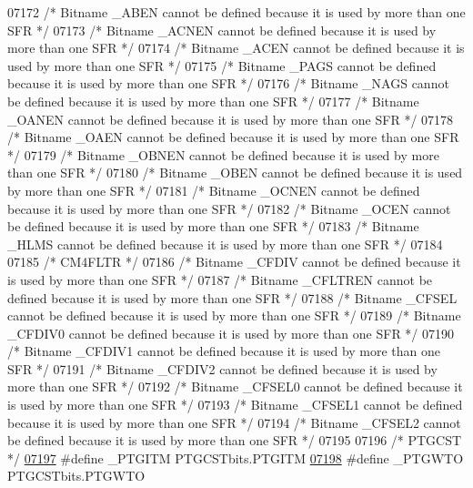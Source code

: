 \begin{DoxyCode}
07172 \textcolor{comment}{/* Bitname \_ABEN cannot be defined because it is used by more than one SFR */}
07173 \textcolor{comment}{/* Bitname \_ACNEN cannot be defined because it is used by more than one SFR */}
07174 \textcolor{comment}{/* Bitname \_ACEN cannot be defined because it is used by more than one SFR */}
07175 \textcolor{comment}{/* Bitname \_PAGS cannot be defined because it is used by more than one SFR */}
07176 \textcolor{comment}{/* Bitname \_NAGS cannot be defined because it is used by more than one SFR */}
07177 \textcolor{comment}{/* Bitname \_OANEN cannot be defined because it is used by more than one SFR */}
07178 \textcolor{comment}{/* Bitname \_OAEN cannot be defined because it is used by more than one SFR */}
07179 \textcolor{comment}{/* Bitname \_OBNEN cannot be defined because it is used by more than one SFR */}
07180 \textcolor{comment}{/* Bitname \_OBEN cannot be defined because it is used by more than one SFR */}
07181 \textcolor{comment}{/* Bitname \_OCNEN cannot be defined because it is used by more than one SFR */}
07182 \textcolor{comment}{/* Bitname \_OCEN cannot be defined because it is used by more than one SFR */}
07183 \textcolor{comment}{/* Bitname \_HLMS cannot be defined because it is used by more than one SFR */}
07184 
07185 \textcolor{comment}{/* CM4FLTR */}
07186 \textcolor{comment}{/* Bitname \_CFDIV cannot be defined because it is used by more than one SFR */}
07187 \textcolor{comment}{/* Bitname \_CFLTREN cannot be defined because it is used by more than one SFR */}
07188 \textcolor{comment}{/* Bitname \_CFSEL cannot be defined because it is used by more than one SFR */}
07189 \textcolor{comment}{/* Bitname \_CFDIV0 cannot be defined because it is used by more than one SFR */}
07190 \textcolor{comment}{/* Bitname \_CFDIV1 cannot be defined because it is used by more than one SFR */}
07191 \textcolor{comment}{/* Bitname \_CFDIV2 cannot be defined because it is used by more than one SFR */}
07192 \textcolor{comment}{/* Bitname \_CFSEL0 cannot be defined because it is used by more than one SFR */}
07193 \textcolor{comment}{/* Bitname \_CFSEL1 cannot be defined because it is used by more than one SFR */}
07194 \textcolor{comment}{/* Bitname \_CFSEL2 cannot be defined because it is used by more than one SFR */}
07195 
07196 \textcolor{comment}{/* PTGCST */}
\hypertarget{a00015_source_l07197}{}\hyperlink{a00015_a389f6f3b11bc8474e69b3e1a495faeaa}{07197} \textcolor{preprocessor}{#define \_PTGITM PTGCSTbits.PTGITM}
\hypertarget{a00015_source_l07198}{}\hyperlink{a00015_a17c86f13a7471cf011048de7051ef3d6}{07198} \textcolor{preprocessor}{#define \_PTGWTO PTGCSTbits.PTGWTO}

\end{DoxyCode}
